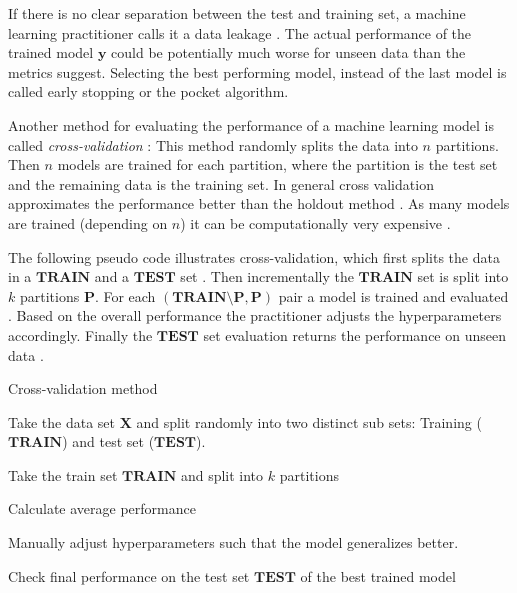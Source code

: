 \documentclass[draft,final,oneside]{vutinfth} %
\begin{document}
If there is no clear separation between the test and training set, a machine learning practitioner calls it a data leakage \cite{doingdatascience}. The actual performance of the trained model $\boldsymbol{y}$ could be potentially much worse for unseen data than the metrics suggest. Selecting the best performing model, instead of the last model is called early stopping or the pocket algorithm.

Another method for evaluating the performance of a machine learning model is called \textit{cross-validation} \cite{holdoutcrossvalidation}: This method randomly splits the data into $n$ partitions. Then $n$ models are trained for each partition, where the partition is the test set and the remaining data is the training set. In general cross validation approximates the performance better than the holdout method \cite{aimodern}. As many models are trained (depending on $n$) it can be computationally very expensive  \cite{bishop}.

The following pseudo code illustrates cross-validation, which first splits the data in a $\boldsymbol{TRAIN}$ and a $\boldsymbol{TEST}$ set \cite{holdoutcrossvalidation}. Then incrementally the $\boldsymbol{TRAIN}$ set is split into $k$ partitions $\boldsymbol{P}$. For each $(\boldsymbol{TRAIN} \setminus \boldsymbol{P}, \boldsymbol{P})$ pair a model is trained and evaluated \cite{bishop}. Based on the overall performance the practitioner adjusts the hyperparameters accordingly. Finally the $\boldsymbol{TEST}$ set evaluation returns the performance on unseen data \cite{holdoutcrossvalidation}.

\begin{algorithm}
\caption{Cross-validation method \cite{holdoutcrossvalidation}}\label{holdoutalgo}
Take the data set $\boldsymbol{X}$ and split randomly into two distinct sub sets: Training ($\boldsymbol{TRAIN}$) and test set ($\boldsymbol{TEST}$).

 {
Take the train set $\boldsymbol{TRAIN}$ and split into $k$ partitions


Calculate average performance

Manually adjust hyperparameters such that the model generalizes better.
}

Check final performance on the test set $\boldsymbol{TEST}$ of the best trained model

\end{algorithm}
\end{document}
